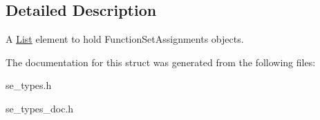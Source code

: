 \subsection{Detailed Description}
A \hyperlink{structList}{List} element to hold Function\+Set\+Assignments objects. 

The documentation for this struct was generated from the following files\+:\begin{DoxyCompactItemize}
\item 
se\+\_\+types.\+h\item 
se\+\_\+types\+\_\+doc.\+h\end{DoxyCompactItemize}
